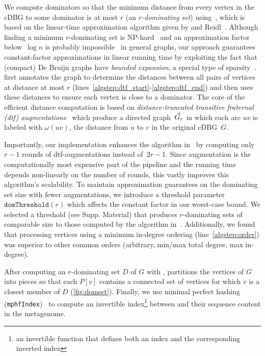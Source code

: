 We compute dominators so that the minimum distance from every vertex
in the cDBG to some dominator is at most $r$ (an \emph{$r$-dominating set})
using~, which is based on the linear-time approximation algorithm
given by \Dvorak and Reidl~\cite{felixThesis}. Although finding a minimum $r$-dominating set is
NP-hard~\cite{karp1972reducibility,chlebik2008approximation,downey2012parameterized} and
an approximation factor below~$\log n$ is probably impossible~\cite{chlebik2008approximation}
in general graphs, our approach guarantees constant-factor approximations
in linear running time by exploiting the fact that
(compact) De Bruijn graphs have \emph{bounded expansion}, a special type of
sparsity~\cite{sparsity}.  first
annotates the graph to determine the distances between all pairs of vertices at
distance at most $r$ (lines~\ref{algstep:dtf_start}-\ref{algstep:dtf_end}) and
then uses these distances to ensure each vertex is close to a dominator.
The core of the efficient distance computation is based on
\emph{distance-truncated transitive fraternal (dtf) augmentations}~\cite{felixThesis}
which produce a directed graph~$\vec{G}_r$ in which each arc $uv$ is labeled with
$\omega(uv)$, the distance from $u$ to $v$ in the original cDBG~$G$.

Importantly, our implementation enhances the algorithm
in~\cite{felixThesis} by computing only $r{-}1$ rounds of dtf-augmentations
instead of~$2r{-}1$. Since augmentation is the computationally most
expensive part of the pipeline and the running time depends non-linearly on
the number of rounds, this vastly improves this algorithm's scalability.
To maintain approximation guarantees on the dominating set size with fewer augmentations,
we introduce a threshold parameter $\texttt{domThreshold}(r)$
which affects the constant factor in our worst-case bound.
We selected a threshold (see Supp. Material) that produces $r$-dominating sets of
comparable size to those computed by the algorithm in~\cite{felixThesis}. Additionally,
we found that processing vertices using a minimum in-degree ordering (line~\ref{algstep:order})
was superior to other common orders (\eg arbitrary, min/max total degree, max in-degree).



After computing an $r$-dominating set $D$ of $G$ with ,
 partitions the vertices of $G$ into pieces so that
each \piece $P[v]$ contains a connected set of vertices for which $v$ is a
closest member of $D$ (\autoref{fig:domset}). Finally, we use minimal perfect
hashing (\texttt{mphfIndex})~\cite{limasset2017mphf} to compute an invertible
index\footnote{an invertible function that defines both an index and the corresponding inverted index}
between \pieces and their sequence content in the metagenome.

